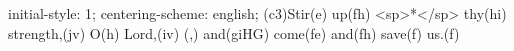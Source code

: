 initial-style: 1;
centering-scheme: english;
(c3)Stir(e) up(fh) <sp>*</sp> thy(hi) strength,(jv) O(h) Lord,(iv) (,) and(giHG) come(fe) and(fh) save(f) us.(f)
